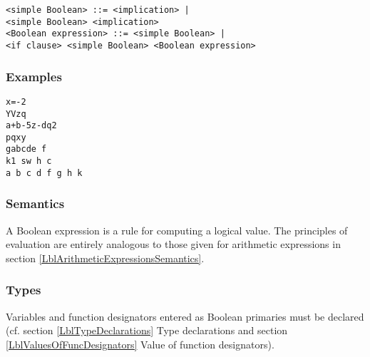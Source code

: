 \documentclass[a4paper,11pt]{article}
\begin{document}
\begin{flushleft}
\vspace{0.2em}\texttt{<simple Boolean> ::= <implication> |\\
  \hspace{1.0cm}<simple Boolean> \mleqv{} <implication>}\\

\vspace{0.2em}\texttt{<Boolean expression> ::= <simple Boolean> |\\
  \hspace{1.0cm}<if clause> <simple Boolean>  <Boolean expression>}\\

\end{flushleft}


\subsubsection{Examples}

\begin{flushleft}
\texttt{x=-2\\
Y\mgt{}V\mlor{}z\mlt{}q\\
a+b\mgt{}-5\mland{}z-d\mgt{}q\mpow{}2\\
p\mland{}q\mlor{}x\mne{}y \\
g\mleqv{}\mlnot{}a\mland{}b\mland{}\mlnot{}c\mlor{}d\mlor{}e\mlimp{}\mlnot{} f\\
 k\mlt{}1  s\mlt{}w  h \mle{} c\\
   a  b  c  d  f  g  h \mlt{} k\\
}\end{flushleft}


\subsubsection{Semantics}
\label{LblBooleanExpressionsSemantics}

A Boolean expression is a rule for computing a logical value.  The
principles of evaluation are entirely analogous to those given for
arithmetic expressions in section \ref{LblArithmeticExpressionsSemantics}.

\subsubsection{Types}
\label{LblBooleanExpressionsTypes}

Variables and function designators entered as Boolean primaries must
be declared  (cf. section \ref{LblTypeDeclarations} Type
declarations and section \ref{LblValuesOfFuncDesignators} Value of
function designators).
\end{document}
